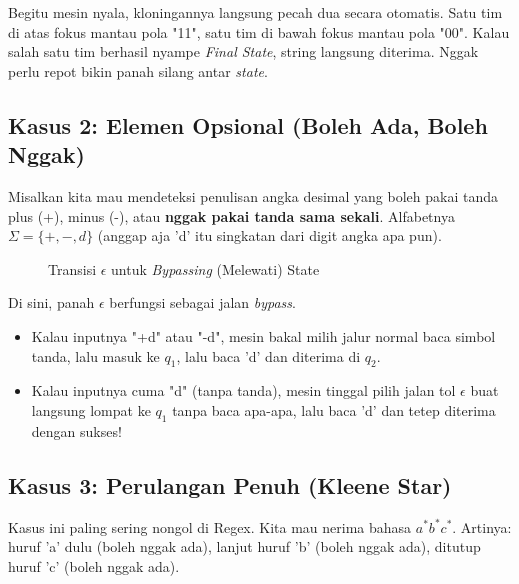 \documentclass[12pt,a4paper]{article}
\begin{document}
Begitu mesin nyala, kloningannya langsung pecah dua secara otomatis. Satu tim di atas fokus mantau pola "11", satu tim di bawah fokus mantau pola "00". Kalau salah satu tim berhasil nyampe \textit{Final State}, string langsung diterima. Nggak perlu repot bikin panah silang antar \textit{state}.

\subsection{Kasus 2: Elemen Opsional (Boleh Ada, Boleh Nggak)}
Misalkan kita mau mendeteksi penulisan angka desimal yang boleh pakai tanda plus (+), minus (-), atau \textbf{nggak pakai tanda sama sekali}. Alfabetnya $\Sigma = \{+, -, d\}$ (anggap aja 'd' itu singkatan dari digit angka apa pun).

\begin{figure}[h]
    \centering
    \caption{Transisi $\epsilon$ untuk \textit{Bypassing} (Melewati) State}
\end{figure}

Di sini, panah $\epsilon$ berfungsi sebagai jalan \textit{bypass}.
\begin{itemize}
    \item Kalau inputnya "+d" atau "-d", mesin bakal milih jalur normal baca simbol tanda, lalu masuk ke $q_1$, lalu baca 'd' dan diterima di $q_2$.
    \item Kalau inputnya cuma "d" (tanpa tanda), mesin tinggal pilih jalan tol $\epsilon$ buat langsung lompat ke $q_1$ tanpa baca apa-apa, lalu baca 'd' dan tetep diterima dengan sukses!
\end{itemize}

\subsection{Kasus 3: Perulangan Penuh (Kleene Star)}
Kasus ini paling sering nongol di Regex. Kita mau nerima bahasa $a^*b^*c^*$. Artinya: huruf 'a' dulu (boleh nggak ada), lanjut huruf 'b' (boleh nggak ada), ditutup huruf 'c' (boleh nggak ada).
\end{document}
